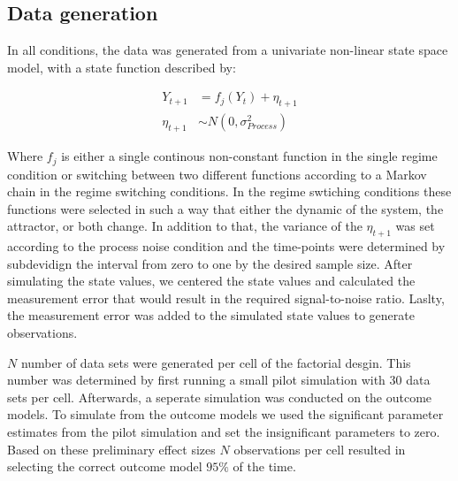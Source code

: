\subsection{Data generation}

In all conditions, the data was generated from a univariate non-linear 
state space model, with a state function described by:

\begin{align*}
    Y_{t+1} &= f_j (Y_{t}) + \eta_{t+1} \\
    \eta_{t+1} &\sim N(0, \sigma^2_{Process})
\end{align*}

Where $f_j$ is either a single continous non-constant function in the single 
regime condition or switching between two different functions according to a 
Markov chain in the regime switching conditions. In the regime swtiching conditions 
these functions were selected in such a way that either the dynamic of the system, 
the attractor, or both change. In addition to that, the variance of the $\eta_{t+1}$
was set according to the process noise condition and the time-points 
were determined by subdevidign the interval from zero to one by the desired sample 
size. After simulating the state values, we centered the state values and calculated
the measurement error that would result in the required signal-to-noise ratio. 
Laslty, the measurement error was added to the simulated state values to generate 
observations. 

$N$ number of data sets were generated per cell of the factorial desgin. This number 
was determined by first running a small pilot simulation with 30 data sets per cell. 
Afterwards, a seperate simulation was conducted on the outcome models. To simulate 
from the outcome models we used the significant parameter estimates from the 
pilot simulation and set the insignificant parameters to zero. Based on these 
preliminary effect sizes $N$ observations per cell resulted in selecting the 
correct outcome model $95\%$ of the time.

